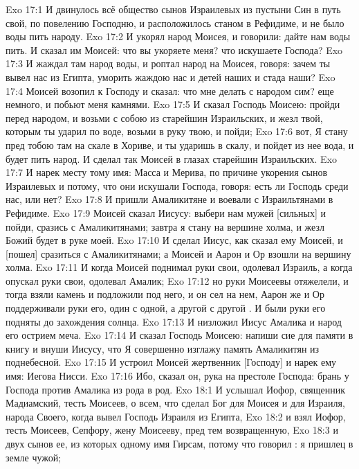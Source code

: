 \vs Exo 17:1 И двинулось всё общество сынов Израилевых из пустыни Син в путь свой, по повелению Господню, и расположилось станом в Рефидиме, и не было воды пить народу.
\vs Exo 17:2 И укорял народ Моисея, и говорили: дайте нам воды пить. И сказал им Моисей: что вы укоряете меня? что искушаете Господа?
\vs Exo 17:3 И жаждал там народ воды, и роптал народ на Моисея, говоря: зачем ты вывел нас из Египта, уморить жаждою нас и детей наших и стада наши?
\vs Exo 17:4 Моисей возопил к Господу и сказал: что мне делать с народом сим? еще немного, и побьют меня камнями.
\vs Exo 17:5 И сказал Господь Моисею: пройди перед народом, и возьми с собою  из старейшин Израильских, и жезл твой, которым ты ударил по воде, возьми в руку твою, и пойди;
\vs Exo 17:6 вот, Я стану пред тобою там на скале в Хориве, и ты ударишь в скалу, и пойдет из нее вода, и будет пить народ. И сделал так Моисей в глазах старейшин Израильских.
\vs Exo 17:7 И нарек месту тому имя: Масса и Мерива, по причине укорения сынов Израилевых и потому, что они искушали Господа, говоря: есть ли Господь среди нас, или нет?
\rsbpar\vs Exo 17:8 И пришли Амаликитяне и воевали с Израильтянами в Рефидиме.
\vs Exo 17:9 Моисей сказал Иисусу: выбери нам мужей [сильных] и пойди, сразись с Амаликитянами; завтра я стану на вершине холма, и жезл Божий будет в руке моей.
\vs Exo 17:10 И сделал Иисус, как сказал ему Моисей, и [пошел] сразиться с Амаликитянами; а Моисей и Аарон и Ор взошли на вершину холма.
\vs Exo 17:11 И когда Моисей поднимал руки свои, одолевал Израиль, а когда опускал руки свои, одолевал Амалик;
\vs Exo 17:12 но руки Моисеевы отяжелели, и тогда взяли камень и подложили под него, и он сел на нем, Аарон же и Ор поддерживали руки его, один с одной, а другой с другой . И были руки его подняты до захождения солнца.
\vs Exo 17:13 И низложил Иисус Амалика и народ его острием меча.
\vs Exo 17:14 И сказал Господь Моисею: напиши сие для памяти в книгу и внуши Иисусу, что Я совершенно изглажу память Амаликитян из поднебесной.
\vs Exo 17:15 И устроил Моисей жертвенник [Господу] и нарек ему имя: Иегова Нисси.
\vs Exo 17:16 Ибо, сказал он, рука на престоле Господа: брань у Господа против Амалика из рода в род.
\vs Exo 18:1 И услышал Иофор, священник Мадиамский, тесть Моисеев, о всем, что сделал Бог для Моисея и для Израиля, народа Своего, когда вывел Господь Израиля из Египта,
\vs Exo 18:2 и взял Иофор, тесть Моисеев, Сепфору, жену Моисееву, пред тем возвращенную,
\vs Exo 18:3 и двух сынов ее, из которых одному имя Гирсам, потому что говорил : я пришлец в земле чужой;
